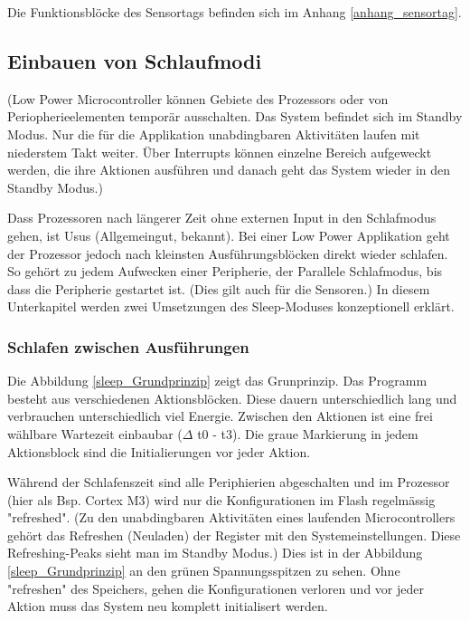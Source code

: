 Die Funktionsblöcke des Sensortags befinden sich im Anhang \ref{anhang_sensortag}.

\subsection{Einbauen von Schlaufmodi}\label{pm_sleep} 

(Low Power Microcontroller können Gebiete des Prozessors oder von Periopherieelementen temporär ausschalten. Das System befindet sich im Standby Modus. Nur die für die Applikation unabdingbaren Aktivitäten laufen mit niederstem Takt weiter. Über Interrupts können einzelne Bereich aufgeweckt werden, die ihre Aktionen ausführen und danach geht das System wieder in den Standby Modus.)


Dass Prozessoren nach längerer Zeit ohne externen Input in den Schlafmodus gehen, ist Usus (Allgemeingut, bekannt). Bei einer Low Power Applikation geht der Prozessor jedoch nach kleinsten Ausführungsblöcken direkt wieder schlafen. So gehört zu jedem Aufwecken einer Peripherie, der Parallele Schlafmodus, bis dass die Peripherie gestartet ist. (Dies gilt auch für die Sensoren.) In diesem Unterkapitel werden zwei Umsetzungen des Sleep-Moduses konzeptionell erklärt.

\subsubsection{Schlafen zwischen Ausführungen}
\label{schlafen_theorie}

Die Abbildung \ref{sleep_Grundprinzip} zeigt das Grunprinzip. Das Programm besteht aus verschiedenen Aktionsblöcken. Diese dauern unterschiedlich lang und verbrauchen unterschiedlich viel Energie. Zwischen den Aktionen ist eine frei wählbare Wartezeit einbaubar ($\Delta$ t0 - t3). Die graue Markierung in jedem Aktionsblock sind die Initialierungen vor jeder Aktion.

Während der Schlafenszeit sind alle Periphierien abgeschalten und im Prozessor (hier als Bsp. Cortex M3) wird nur die Konfigurationen im Flash regelmässig "refreshed". (Zu den unabdingbaren Aktivitäten eines laufenden Microcontrollers gehört das Refreshen (Neuladen) der Register mit den Systemeinstellungen. Diese Refreshing-Peaks sieht man im Standby Modus.)  Dies ist in der Abbildung \ref{sleep_Grundprinzip} an den grünen Spannungsspitzen zu sehen. Ohne "refreshen" des Speichers, gehen die Konfigurationen verloren und vor jeder Aktion muss das System neu komplett initialisert werden.

